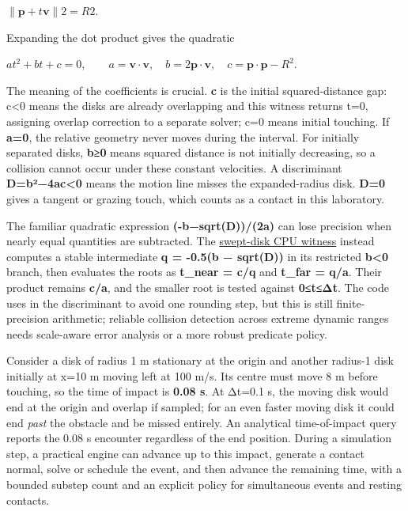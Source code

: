 \(\lVert \mathbf p+t\mathbf v\rVert2=R2.\)

Expanding the dot product gives the quadratic

\(at^2+bt+c=0,\qquad a=\mathbf v\cdot\mathbf v,\quad b=2\mathbf p\cdot\mathbf v,\quad c=\mathbf p\cdot\mathbf p-R^2.\)

The meaning of the coefficients is crucial. \textbf{c} is the initial squared-distance gap: c\textless0 means the disks are already overlapping and this witness returns t=0, assigning overlap correction to a separate solver; c=0 means initial touching. If \textbf{a=0}, the relative geometry never moves during the interval. For initially separated disks, \textbf{b≥0} means squared distance is not initially decreasing, so a collision cannot occur under these constant velocities. A discriminant \textbf{D=b²−4ac\textless0} means the motion line misses the expanded-radius disk. \textbf{D=0} gives a tangent or grazing touch, which counts as a contact in this laboratory.

The familiar quadratic expression \textbf{(-b−sqrt(D))/(2a)} can lose precision when nearly equal quantities are subtracted. The \hyperref[source-file-887bbb1db2a031cbbf1eee43]{swept-disk CPU witness} instead computes a stable intermediate \textbf{q = -0.5(b − sqrt(D))} in its restricted \textbf{b\textless0} branch, then evaluates the roots as \textbf{t\_near = c/q} and \textbf{t\_far = q/a}. Their product remains \textbf{c/a}, and the smaller root is tested against \textbf{0≤t≤Δt}. The code uses  in the discriminant to avoid one rounding step, but this is still finite-precision arithmetic; reliable collision detection across extreme dynamic ranges needs scale-aware error analysis or a more robust predicate policy.

Consider a disk of radius 1 m stationary at the origin and another radius-1 disk initially at x=10 m moving left at 100 m/s. Its centre must move 8 m before touching, so the time of impact is \textbf{0.08 s}. At Δt=0.1 s, the moving disk would end at the origin and overlap if sampled; for an even faster moving disk it could end \emph{past} the obstacle and be missed entirely. An analytical time-of-impact query reports the 0.08 s encounter regardless of the end position. During a simulation step, a practical engine can advance up to this impact, generate a contact normal, solve or schedule the event, and then advance the remaining time, with a bounded substep count and an explicit policy for simultaneous events and resting contacts.

